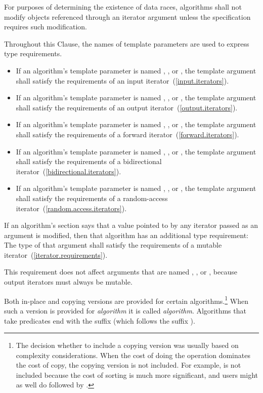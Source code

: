 \pnum
For purposes of determining the existence of data races, algorithms shall
not modify objects referenced through an iterator argument unless the
specification requires such modification.

\pnum
Throughout this Clause, the names of template parameters
are used to express type requirements.
\begin{itemize}
\item
If an algorithm's template parameter is named
,
,
or
,
the template argument shall satisfy the
requirements of an input iterator~(\ref{input.iterators}).
\item
If an algorithm's template parameter is named
,
,
or
,
the template argument shall satisfy the requirements
of an output iterator~(\ref{output.iterators}).
\item
If an algorithm's template parameter is named
,
,
or
,
the template argument shall satisfy the requirements
of a forward iterator~(\ref{forward.iterators}).
\item
If an algorithm's template parameter is named
,
,
or
,
the template argument shall satisfy the requirements
of a bidirectional iterator~(\ref{bidirectional.iterators}).
\item
If an algorithm's template parameter is named
,
,
or
,
the template argument shall satisfy the requirements
of a random-access iterator~(\ref{random.access.iterators}).
\end{itemize}

\pnum
If an algorithm's
\effects
section says that a value pointed to by any iterator passed
as an argument is modified, then that algorithm has an additional
type requirement:
The type of that argument shall satisfy the requirements
of a mutable iterator~(\ref{iterator.requirements}).
\begin{note}
This requirement does not affect arguments that are named
,
,
or
,
because output iterators must always be mutable.
\end{note}

\pnum
Both in-place and copying versions are provided for certain
algorithms.\footnote{The decision whether to include a copying version was
usually based on complexity considerations. When the cost of doing the operation
dominates the cost of copy, the copying version is not included. For example,
 is not included because the cost of sorting is much more
significant, and users might as well do  followed by .}
When such a version is provided for \textit{algorithm} it is called
\textit{algorithm}. Algorithms that take predicates end with the
suffix  (which follows the suffix ).

